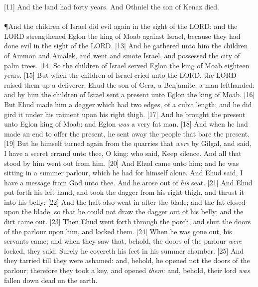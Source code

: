 [11] \textcolor[cmyk]{0.99998,1,0,0}{And the land had  forty years. And Othniel the son of Kenaz died.}\\
\\
\P \textcolor[cmyk]{0.99998,1,0,0}{And the children of Israel did evil again in the sight of the LORD: and the LORD strengthened Eglon the king of Moab against Israel, because they had done evil in the sight of the LORD.}
[13] \textcolor[cmyk]{0.99998,1,0,0}{And he gathered unto him the children of Ammon and Amalek, and went and smote Israel, and possessed the city of palm trees.}
[14] \textcolor[cmyk]{0.99998,1,0,0}{So the children of Israel served Eglon the king of Moab eighteen years.}
[15] \textcolor[cmyk]{0.99998,1,0,0}{But when the children of Israel cried unto the LORD, the LORD raised them up a deliverer, Ehud the son of Gera, a Benjamite, a man lefthanded: and by him the children of Israel sent a present unto Eglon the king of Moab.}
[16] \textcolor[cmyk]{0.99998,1,0,0}{But Ehud made him a dagger which had two edges, of a cubit length; and he did gird it under his raiment upon his right thigh.}
[17] \textcolor[cmyk]{0.99998,1,0,0}{And he brought the present unto Eglon king of Moab: and Eglon \emph{was} a very fat man.}
[18] \textcolor[cmyk]{0.99998,1,0,0}{And when he had made an end to offer the present, he sent away the people that bare the present.}
[19] \textcolor[cmyk]{0.99998,1,0,0}{But he himself turned again from the quarries that \emph{were} by Gilgal, and said, I have a secret errand unto thee, O king: who said, Keep silence. And all that stood by him went out from him.}
[20] \textcolor[cmyk]{0.99998,1,0,0}{And Ehud came unto him; and he was sitting in a summer parlour, which he had for himself alone. And Ehud said, I have a message from God unto thee. And he arose out of \emph{his} seat.}
[21] \textcolor[cmyk]{0.99998,1,0,0}{And Ehud put forth his left hand, and took the dagger from his right thigh, and thrust it into his belly:}
[22] \textcolor[cmyk]{0.99998,1,0,0}{And the haft also went in after the blade; and the fat closed upon the blade, so that he could not draw the dagger out of his belly; and the dirt came out.}
[23] \textcolor[cmyk]{0.99998,1,0,0}{Then Ehud went forth through the porch, and shut the doors of the parlour upon him, and locked them.}
[24] \textcolor[cmyk]{0.99998,1,0,0}{When he was gone out, his servants came; and when they saw that, behold, the doors of the parlour \emph{were} locked, they said, Surely he covereth his feet in his summer chamber.}
[25] \textcolor[cmyk]{0.99998,1,0,0}{And they tarried till they were ashamed: and, behold, he opened not the doors of the parlour; therefore they took a key, and opened \emph{them}: and, behold, their lord \emph{was} fallen down dead on the earth.}
